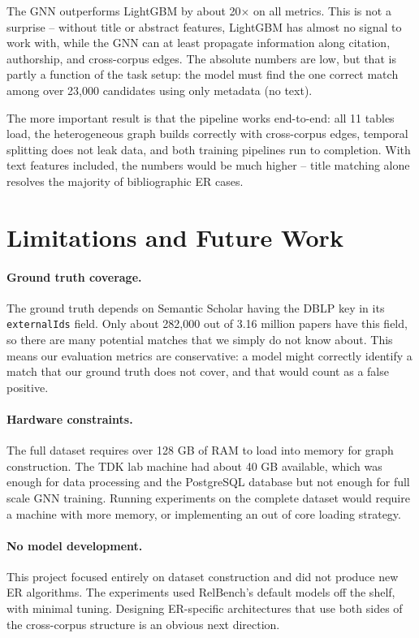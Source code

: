 \documentclass{article}
\begin{document}
The GNN outperforms LightGBM by about 20$\times$ on all metrics.
This is not a surprise -- without title or abstract features, LightGBM has almost no signal to work with, while the GNN can at least propagate information along citation, authorship, and cross-corpus edges.
The absolute numbers are low, but that is partly a function of the task setup: the model must find the one correct match among over 23,000 candidates using only metadata (no text).

The more important result is that the pipeline works end-to-end: all 11 tables load, the heterogeneous graph builds correctly with cross-corpus edges, temporal splitting does not leak data, and both training pipelines run to completion.
With text features included, the numbers would be much higher -- title matching alone resolves the majority of bibliographic ER cases.


\section{Limitations and Future Work}
\label{sec:limitations}

\paragraph{Ground truth coverage.}
The ground truth depends on Semantic Scholar having the DBLP key in its \texttt{externalIds} field.
Only about 282,000 out of 3.16 million papers have this field, so there are many potential matches that we simply do not know about.
This means our evaluation metrics are conservative: a model might correctly identify a match that our ground truth does not cover, and that would count as a false positive.

\paragraph{Hardware constraints.}
The full dataset requires over 128 GB of RAM to load into memory for graph construction.
The TDK lab machine had about 40 GB available, which was enough for data processing and the PostgreSQL database but not enough for full scale GNN training.
Running experiments on the complete dataset would require a machine with more memory, or implementing an out of core loading strategy.

\paragraph{No model development.}
This project focused entirely on dataset construction and did not produce new ER algorithms.
The experiments used RelBench's default models off the shelf, with minimal tuning.
Designing ER-specific architectures that use both sides of the cross-corpus structure is an obvious next direction.
\end{document}
